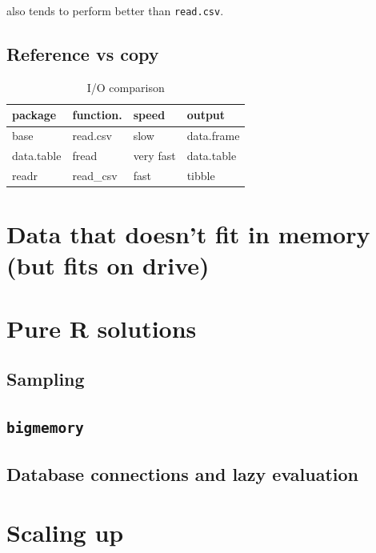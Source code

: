 \documentclass[]{book}
\theoremstyle{definition}
\theoremstyle{definition}
\theoremstyle{definition}
\theoremstyle{remark}
\begin{document}
also tends to perform better than \texttt{read.csv}.

\subsection{Reference vs copy}\label{reference-vs-copy}

\begin{table}

\caption{\label{tab:unnamed-chunk-108}I/O comparison}
\centering
\begin{tabular}[t]{l|l|l|l}
\hline
package & function. & speed & output\\
\hline
base & read.csv & slow & data.frame\\
\hline
data.table & fread & very fast & data.table\\
\hline
readr & read\_csv & fast & tibble\\
\hline
\end{tabular}
\end{table}

\section{Data that doesn't fit in memory (but fits on
drive)}\label{data-that-doesnt-fit-in-memory-but-fits-on-drive}

\section{Pure R solutions}\label{pure-r-solutions}

\subsection{Sampling}\label{sampling}

\subsection{\texorpdfstring{\texttt{bigmemory}}{bigmemory}}\label{bigmemory}

\subsection{Database connections and lazy
evaluation}\label{database-connections-and-lazy-evaluation}

\section{Scaling up}\label{scaling-up}
\end{document}
